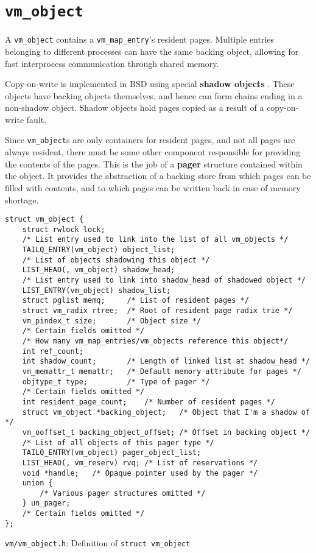 \documentclass[shortabstract, english]{iithesis}
\begin{document}
\section{\texttt{vm_object}}

A \texttt{vm_object} contains a \texttt{vm_map_entry}'s resident
pages. Multiple entries belonging to different processes can have the same
backing object, allowing for fast interprocess communication through shared
memory.

Copy-on-write is implemented in BSD using special \textbf{shadow objects}
\cite[Page~304]{bib:mckusick14}. These objects have backing objects themselves,
and hence can form chains ending in a non-shadow object. Shadow objects hold
pages copied as a result of a copy-on-write fault.

Since \texttt{vm_object}s are only containers for resident pages, and not
all pages are always resident, there must be some other component responsible
for providing the contents of the pages. This is the job of a \textbf{pager}
\cite[Section~6.10]{bib:mckusick14} structure contained within the object. It
provides the abstraction of a backing store from which pages can be filled with
contents, and to which pages can be written back in case of memory shortage.

\begin{listing}[H]
\begin{verbatim}
struct vm_object {
    struct rwlock lock;
    /* List entry used to link into the list of all vm_objects */
    TAILQ_ENTRY(vm_object) object_list;
    /* List of objects shadowing this object */
    LIST_HEAD(, vm_object) shadow_head;
    /* List entry used to link into shadow_head of shadowed object */
    LIST_ENTRY(vm_object) shadow_list;
    struct pglist memq;     /* List of resident pages */
    struct vm_radix rtree;  /* Root of resident page radix trie */
    vm_pindex_t size;       /* Object size */
    /* Certain fields omitted */
    /* How many vm_map_entries/vm_objects reference this object*/
    int ref_count;
    int shadow_count;       /* Length of linked list at shadow_head */
    vm_memattr_t memattr;   /* Default memory attribute for pages */
    objtype_t type;         /* Type of pager */
    /* Certain fields omitted */
    int resident_page_count;    /* Number of resident pages */
    struct vm_object *backing_object;   /* Object that I'm a shadow of */
    vm_ooffset_t backing_object_offset; /* Offset in backing object */
    /* List of all objects of this pager type */
    TAILQ_ENTRY(vm_object) pager_object_list;
    LIST_HEAD(, vm_reserv) rvq; /* List of reservations */
    void *handle;   /* Opaque pointer used by the pager */
    union {
        /* Various pager structures omitted */
    } un_pager;
    /* Certain fields omitted */
};
\end{verbatim}
\caption{\texttt{vm/vm\_object.h}: Definition of \texttt{struct vm_object}}
\end{listing}
\end{document}
